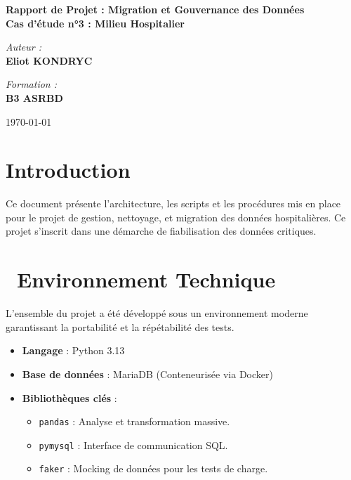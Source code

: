 \documentclass[12pt, a4paper]{article}
\begin{document}
\begin{titlepage}
    \centering
    \vspace*{2cm}
    {\Huge \textbf{Rapport de Projet : Migration et Gouvernance des Données}}\\[1cm]
    {\Large \textbf{Cas d'étude n°3 : Milieu Hospitalier}}\\[2cm]
    
    \vfill
    
    \begin{minipage}{0.4\textwidth}
        \begin{flushleft} \large
            \emph{Auteur :}\\
            \textbf{Eliot KONDRYC}
        \end{flushleft}
    \end{minipage}
    \begin{minipage}{0.4\textwidth}
        \begin{flushright} \large
            \emph{Formation :}\\
            \textbf{B3 ASRBD}\\
        \end{flushright}
    \end{minipage}

    \vfill
    {\large \today}
\end{titlepage}

\tableofcontents
\newpage


\section{Introduction}
Ce document présente l'architecture, les scripts et les procédures mis en place pour le projet de gestion, nettoyage, et migration des données hospitalières. Ce projet s'inscrit dans une démarche de fiabilisation des données critiques.

\section{\faCog \ Environnement Technique}
L'ensemble du projet a été développé sous un environnement moderne garantissant la portabilité et la répétabilité des tests.
\begin{itemize}[label=\textbullet]
    \item \textbf{Langage} : Python 3.13
    \item \textbf{Base de données} : MariaDB (Conteneurisée via Docker)
    \item \textbf{Bibliothèques clés} : 
    \begin{itemize}
        \item \texttt{pandas} : Analyse et transformation massive.
        \item \texttt{pymysql} : Interface de communication SQL.
        \item \texttt{faker} : Mocking de données pour les tests de charge.
    \end{itemize}
\end{itemize}
\end{document}
